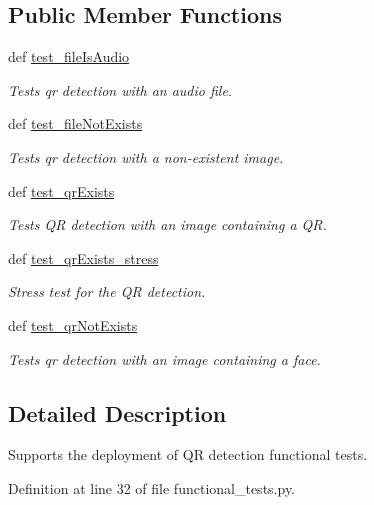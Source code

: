 \subsection*{Public Member Functions}
\begin{DoxyCompactItemize}
\item 
def \hyperlink{classfunctional__tests_1_1QrDetFunc_ab9e7744d7466cd2d6239acff3ed34482}{test\-\_\-file\-Is\-Audio}
\begin{DoxyCompactList}\small\item\em Tests qr detection with an audio file. \end{DoxyCompactList}\item 
def \hyperlink{classfunctional__tests_1_1QrDetFunc_a50f699dc407c7dd60c0c1b92d294358c}{test\-\_\-file\-Not\-Exists}
\begin{DoxyCompactList}\small\item\em Tests qr detection with a non-\/existent image. \end{DoxyCompactList}\item 
def \hyperlink{classfunctional__tests_1_1QrDetFunc_a9991befad3e56709f97095e86a333b44}{test\-\_\-qr\-Exists}
\begin{DoxyCompactList}\small\item\em Tests Q\-R detection with an image containing a Q\-R. \end{DoxyCompactList}\item 
def \hyperlink{classfunctional__tests_1_1QrDetFunc_a821119292e7d339f39e71007319b7f65}{test\-\_\-qr\-Exists\-\_\-stress}
\begin{DoxyCompactList}\small\item\em Stress test for the Q\-R detection. \end{DoxyCompactList}\item 
def \hyperlink{classfunctional__tests_1_1QrDetFunc_a368936a40e7324ea46ae3e920f25a70a}{test\-\_\-qr\-Not\-Exists}
\begin{DoxyCompactList}\small\item\em Tests qr detection with an image containing a face. \end{DoxyCompactList}\end{DoxyCompactItemize}


\subsection{Detailed Description}
Supports the deployment of Q\-R detection functional tests. 

Definition at line 32 of file functional\-\_\-tests.\-py.




